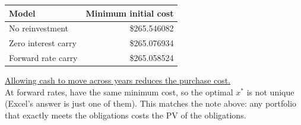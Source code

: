 \begin{example}
    \begin{center}
    \begin{tabular}{lr}
        \toprule
        Model & Minimum initial cost\\
        \midrule
        No reinvestment & \$265.546082\\
        Zero interest carry & \$265.076934\\
        Forward rate carry & \$265.058524\\
        \bottomrule
    \end{tabular}
    \end{center}
    \ul{Allowing cash to move across years reduces the purchase cost.}
    \\At forward rates,  have the same minimum cost, so the optimal $x^*$ is not unique (Excel's answer is just one of them). This matches the note above: any portfolio that exactly meets the obligations costs the PV of the obligations.
\end{example}
